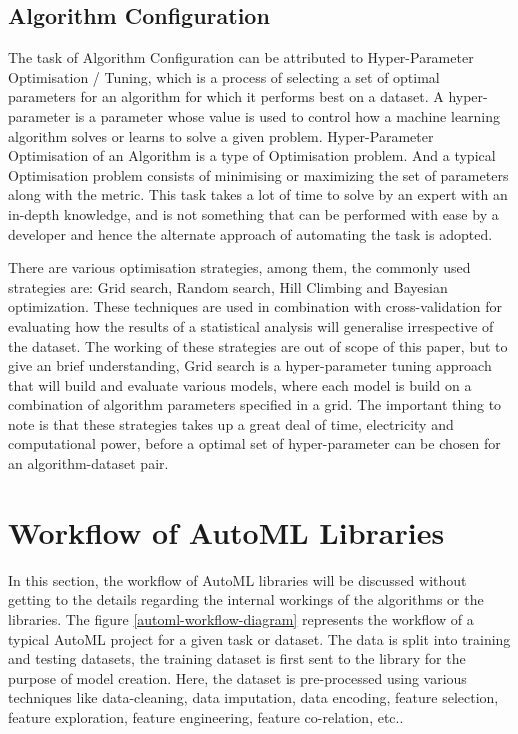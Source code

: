 \subsection{Algorithm Configuration}

The task of Algorithm Configuration can be attributed to Hyper-Parameter Optimisation / Tuning, which is a process of selecting a set of optimal parameters for an algorithm for which it performs best on a dataset. A hyper-parameter is a parameter whose value is used to control how a machine learning algorithm solves or learns to solve a given problem. Hyper-Parameter Optimisation of an Algorithm is a type of Optimisation problem. And a typical Optimisation problem consists of minimising or maximizing the set of parameters along with the metric. This task takes a lot of time to solve by an expert with an in-depth knowledge, and is not something that can be performed with ease by a developer and hence the alternate approach of automating the task is adopted.

There are various optimisation strategies, among them, the commonly used strategies are: Grid search, Random search, Hill Climbing and Bayesian optimization. These techniques are used in combination with cross-validation for evaluating how the results of a statistical analysis will generalise irrespective of the dataset. The working of these strategies are out of scope of this paper, but to give an brief understanding, Grid search is a hyper-parameter tuning approach that will build and evaluate various models, where each model is build on a combination of algorithm parameters specified in a grid. The important thing to note is that these strategies takes up a great deal of time, electricity and computational power, before a optimal set of hyper-parameter can be chosen for an algorithm-dataset pair.

\section{Workflow of AutoML Libraries}
\label{workflow-automl}

In this section, the workflow of AutoML libraries will be discussed without getting to the details regarding the internal workings of the algorithms or the libraries. The figure \ref{automl-workflow-diagram} represents the workflow of a typical AutoML project for a given task or dataset. The data is split into training and testing datasets, the training dataset is first sent to the library for the purpose of model creation. Here, the dataset is pre-processed using various techniques like data-cleaning, data imputation, data encoding, feature selection, feature exploration, feature engineering, feature co-relation, etc..


